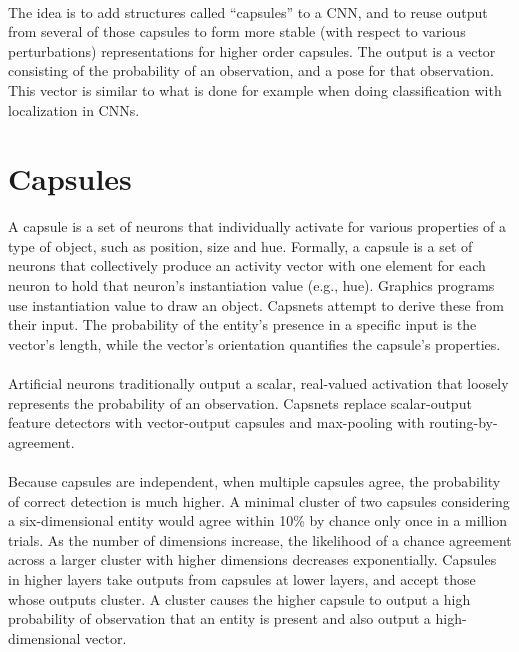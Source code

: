 \documentclass[a4paper,12pt]{report}
\begin{document}
\paragraph{}
The idea is to add structures called “capsules” to a CNN, and to reuse output from several of those capsules to form more stable (with respect to various perturbations) representations for higher order capsules. The output is a vector consisting of the probability of an observation, and a pose for that observation. This vector is similar to what is done for example when doing classification with localization in CNNs.

\section{Capsules}
A capsule is a set of neurons that individually activate for various properties of a type of object, such as position, size and hue. Formally, a capsule is a set of neurons that collectively produce an activity vector with one element for each neuron to hold that neuron's instantiation value (e.g., hue). Graphics programs use instantiation value to draw an object. Capsnets attempt to derive these from their input. The probability of the entity's presence in a specific input is the vector's length, while the vector's orientation quantifies the capsule's properties.

\paragraph{}
Artificial neurons traditionally output a scalar, real-valued activation that loosely represents the probability of an observation. Capsnets replace scalar-output feature detectors with vector-output capsules and max-pooling with routing-by-agreement.

\paragraph{}
Because capsules are independent, when multiple capsules agree, the probability of correct detection is much higher. A minimal cluster of two capsules considering a six-dimensional entity would agree within 10\% by chance only once in a million trials. As the number of dimensions increase, the likelihood of a chance agreement across a larger cluster with higher dimensions decreases exponentially. Capsules in higher layers take outputs from capsules at lower layers, and accept those whose outputs cluster. A cluster causes the higher capsule to output a high probability of observation that an entity is present and also output a high-dimensional vector.
\end{document}
